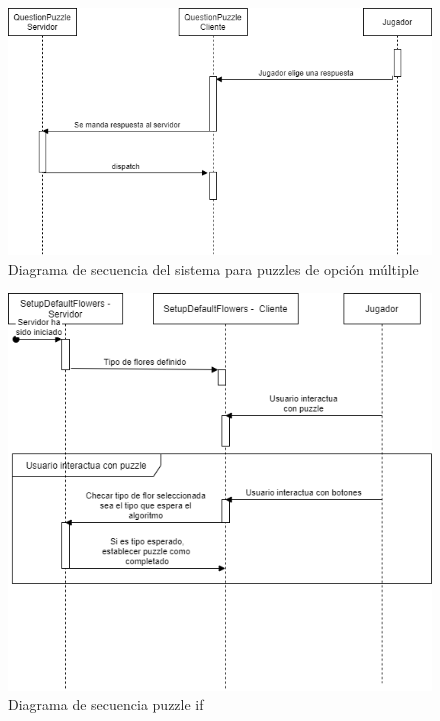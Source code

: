         \begin{figure}[H]
        \centering
        \includegraphics[width=0.8\linewidth]{images/DiagramaSecuenciaPuzzleOpcionMultiple.png}
        \caption{Diagrama de secuencia del sistema para puzzles de opción múltiple}
        \label{fig:diagrama_sec_opmul}
    \end{figure}
        \begin{figure}[H]
        \centering
        \includegraphics[width=0.8\linewidth]{images/DiagramaSecuenciaPuzzleIf.png}
        \caption{Diagrama de secuencia puzzle if}
        \label{fig:diagrama_sec_if}
    \end{figure}
